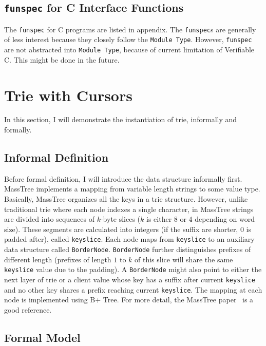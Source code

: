 \documentclass[runningheads]{llncs}
\begin{document}
\subsection{\texttt{funspec} for C Interface Functions}

The \texttt{funspec} for C programs are listed in appendix. The
\texttt{funspec}s are generally of less interest because they closely follow
the \texttt{Module Type}. However, \texttt{funspec} are not abstracted into
\texttt{Module Type}, because of current limitation of Verifiable C. This might
be done in the future.

\section{Trie with Cursors}\label{trie}

In this section, I will demonstrate the instantiation of trie, informally and
formally.

\subsection{Informal Definition}

Before formal definition, I will introduce the data structure informally first.
MassTree implements a mapping from variable length strings to some value type.
Basically, MassTree organizes all the keys in a trie structure. However,
unlike traditional trie where each node indexes a single character, in MassTree
strings are divided into sequences of $k$-byte slices ($k$ is either 8 or
4 depending on word size). These segments are calculated into integers (if the
suffix are shorter, 0 is padded after), called \texttt{keyslice}. Each node
maps from \texttt{keyslice} to an auxiliary data structure called
\texttt{BorderNode}. \texttt{BorderNode} further distinguishes prefixes of
different length (prefixes of length $1$ to $k$ of this slice will share the
same \texttt{keyslice} value due to the padding). A \texttt{BorderNode} might
also point to either the next layer of trie or a client value whose key has a
suffix after current \texttt{keyslice} and no other key shares a prefix reaching
current \texttt{keyslice}. The mapping at each node is implemented using B+
Tree. For more detail, the MassTree paper~\cite{masstree} is a good reference.     


\subsection{Formal Model}
\end{document}
